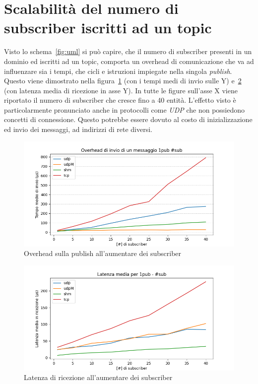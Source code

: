 \section{Scalabilità del numero di subscriber iscritti ad un topic}
Visto lo schema~\ref{fig:uml} si può capire, che il numero di subscriber presenti in un dominio ed iscritti ad un topic, comporta un overhead di comunicazione che va ad influenzare sia i tempi, che cicli e istruzioni impiegate nella singola \emph{publish}. Questo viene dimostrato nella figura~\ref{fig:test3_overhead} (con i tempi medi di invio sulle Y) e~\ref{fig:test3_latenza} (con latenza media di ricezione in asse Y). In tutte le figure sull'asse X viene riportato il numero di subscriber che cresce fino a 40 entità. L'effetto visto è particolarmente pronunciato anche in protocolli come \emph{UDP} che non possiedono concetti di connessione. Questo potrebbe essere dovuto al costo di inizializzazione ed invio dei messaggi, ad indirizzi di rete diversi.
\begin{figure}[H]
    \centering
    \includegraphics[width=\textwidth]{./results/test3_sending_multiplesub.png}
    \caption{Overhead sulla publish all'aumentare dei subscriber}\label{fig:test3_overhead}
\end{figure}
\begin{figure}[H]
    \centering
    \includegraphics[width=\textwidth]{./results/test3_sendingreceiving_multiplesub.png} 
    \caption{Latenza di ricezione all'aumentare dei subscriber}\label{fig:test3_latenza}
\end{figure}

